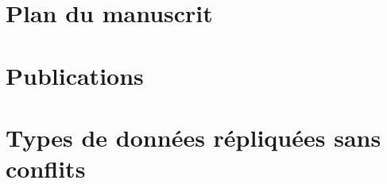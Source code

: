 \documentclass[12pt]{thesul}
\theoremstyle{definition}
\begin{document}
\section{Plan du manuscrit}
\section{Publications}


% 



\section{Types de données répliquées sans conflits}


% 

% 

% 
\end{document}
